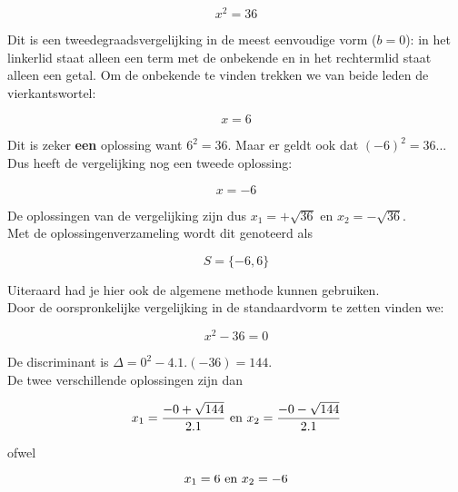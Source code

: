 \begin{voorbeeld}
	
\[x^2=36\]

Dit is een tweedegraadsvergelijking in de meest eenvoudige vorm ($b=0$): in het linkerlid staat alleen een term met de onbekende en in het rechtermlid staat alleen een getal. Om de onbekende te vinden trekken we van beide leden de vierkantswortel:

\[ x=6 \]

Dit is zeker {\bf een} oplossing want $6^2 =36$. Maar er geldt ook dat $(-6)^2 =36$... Dus heeft de vergelijking nog een tweede oplossing:

\[ x=-6 \]

De oplossingen van de vergelijking zijn dus $x_{1}=+\sqrt{36}$ en $x_{2}=-\sqrt{36}$.\\
Met de oplossingenverzameling wordt dit genoteerd als

\[ S=\{ -6,6 \} \]

Uiteraard had je hier ook de algemene methode kunnen gebruiken.\\
Door de oorspronkelijke vergelijking in de standaardvorm te zetten vinden we:

\[ x^2 - 36 =0 \]

De discriminant is $\Delta= 0^2 - 4.1.(-36) = 144$.\\
De twee verschillende oplossingen zijn dan

\[ x_{1}=\frac{-0 + \sqrt{144}}{2.1} \textup{  en  } x_{2}=\frac{-0 - \sqrt{144}}{2.1} \]

ofwel

\[ x_{1}=6 \textup{  en  } x_{2}=-6 \]


\end{voorbeeld}


